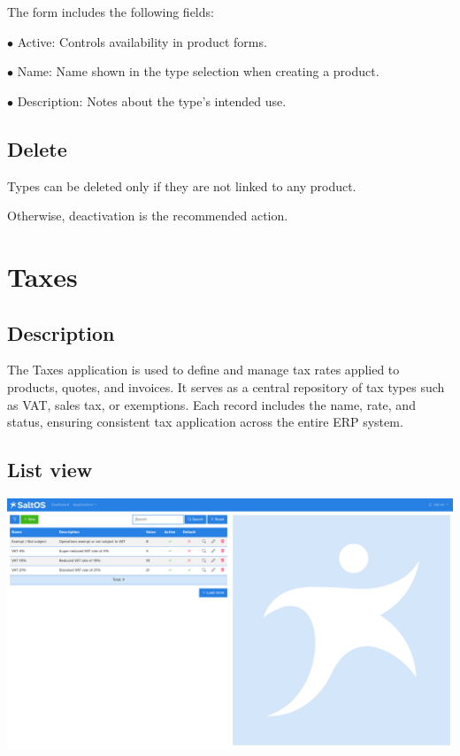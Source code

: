 \documentclass[a4paper]{article}
\begin{document}
The form includes the following fields:

\begin{compactitem}
\item[\color{myblue}$\bullet$] Active: Controls availability in product forms.
\item[\color{myblue}$\bullet$] Name: Name shown in the type selection when creating a product.
\item[\color{myblue}$\bullet$] Description: Notes about the type’s intended use.
\end{compactitem}

\hypertarget{toc165}{}
\subsection{Delete}

Types can be deleted only if they are not linked to any product.

Otherwise, deactivation is the recommended action.


\hypertarget{toc166}{}
\section{Taxes}

\hypertarget{toc167}{}
\subsection{Description}

The Taxes application is used to define and manage tax rates applied to products, quotes, and invoices.
It serves as a central repository of tax types such as VAT, sales tax, or exemptions.
Each record includes the name, rate, and status, ensuring consistent tax application across the entire ERP system.

\hypertarget{toc168}{}
\subsection{List view}

\begin{center}\includegraphics[width=1\textwidth]{../ujest/snaps/test-screenshots-js-screenshots-sales-taxes-list-en-us-1-snap.png}\end{center}
\end{document}
